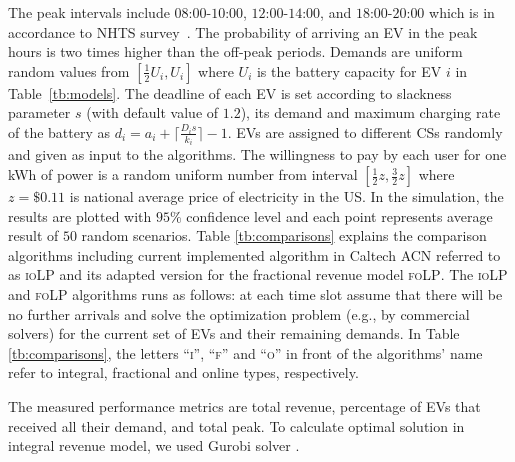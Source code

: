 \documentclass[journal]{IEEEtran}
\newcommand{\rev}[1]{{\color{black}#1}}%
\newcommand{\revv}[1]{{\color{black}#1}}%
\newcommand{\rev}[1]{#1}
\newcommand{\iolp}{\textsc{ioLP}\xspace}
\newcommand{\folp}{\textsc{foLP}\xspace}
\begin{document}
The peak intervals include $08$:$00$-$10$:$00$, $12$:$00$-$14$:$00$, and $18$:$00$-$20$:$00$ which is in accordance to NHTS survey~\cite{Santos, Tang}. \revv{The probability of arriving an EV in the peak hours is two times higher than the off-peak periods.
			Demands are uniform random values from 
			$[\frac{1}{2}U_i,U_i]$} where $U_i$ is the battery capacity for EV $i$ in Table~\ref{tb:models}. \revv{The deadline of each EV is set according to slackness parameter $s$ (with default value of $1.2$), its demand and maximum charging rate of the battery as $d_i=a_i+\lceil \frac{D_is}{k_i} \rceil -1$.} 
			\revv{EVs are assigned to different CSs randomly and given as input to the algorithms. The willingness to pay by each user for one kWh of power is a random uniform number from interval $[\frac{1}{2} z,\frac{3}{2}z]$ where $z=\$0.11$ is national average price of electricity in the US\cite{kWhcost}.}			
			In the simulation, the results are plotted with $95\%$ confidence level and each point represents average result of $50$ random scenarios. Table \ref{tb:comparisons} explains the comparison algorithms \revv{including current implemented algorithm in Caltech ACN referred to as \iolp \cite{lee2016adaptive} and its adapted version for the fractional revenue model \folp. The \iolp and \folp algorithms runs as follows: at each time slot assume that there will be no further arrivals and solve the optimization problem (e.g., by commercial solvers) for the current set of EVs and their remaining demands. In Table \ref{tb:comparisons}, the letters ``\textsc{i}'', ``\textsc{f}'' and ``\textsc{o}'' in front of the algorithms' name refer to integral, fractional and online types, respectively.} 
			
			The measured performance metrics are total revenue, percentage of EVs that received all their demand, and total peak. \revv{To calculate optimal solution in integral revenue model, we used Gurobi solver \cite{optimization2013gurobi}.} 
			
\end{document}
